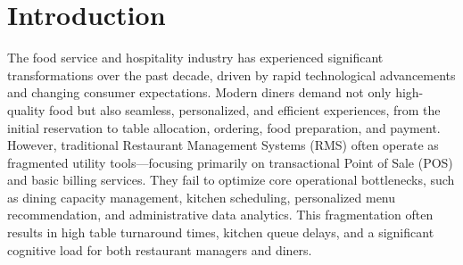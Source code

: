\documentclass[pdflatex,sn-mathphys-num]{sn-jnl}%
\theoremstyle{thmstyleone}%
\theoremstyle{thmstyletwo}%
\theoremstyle{thmstylethree}%
\begin{document}


\maketitle

\section{Introduction}\label{sec1}

The food service and hospitality industry has experienced significant transformations over the past decade, driven by rapid technological advancements and changing consumer expectations. Modern diners demand not only high-quality food but also seamless, personalized, and efficient experiences, from the initial reservation to table allocation, ordering, food preparation, and payment. However, traditional Restaurant Management Systems (RMS) often operate as fragmented utility tools—focusing primarily on transactional Point of Sale (POS) and basic billing services. They fail to optimize core operational bottlenecks, such as dining capacity management, kitchen scheduling, personalized menu recommendation, and administrative data analytics. This fragmentation often results in high table turnaround times, kitchen queue delays, and a significant cognitive load for both restaurant managers and diners.
\end{document}
